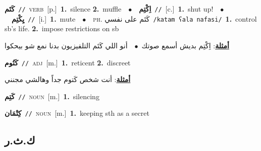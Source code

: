 \documentclass[10pt,a4paper,twoside]{article} %
\begin{document}
\begin{multicols}{2}
{\setlength\topsep{0pt}\textbf{\foreignlanguage{arabic}{كَتَم}}\ {\color{gray}\texttt{//}\color{black}}\ \textsc{verb}\ [p.]\ \textbf{1.}~silence  \textbf{2.}~muffle\ \ $\bullet$\ \ \setlength\topsep{0pt}\textbf{\foreignlanguage{arabic}{اِكْتِم}}\ {\color{gray}\texttt{//}\color{black}}\ [c.]\ \textbf{1.}~shut up!\ \ $\bullet$\ \ \setlength\topsep{0pt}\textbf{\foreignlanguage{arabic}{يِكْتِم}}\ {\color{gray}\texttt{//}\color{black}}\ [i.]\ \textbf{1.}~mute\ \ $\bullet$\ \ \textsc{ph.} \color{gray} \foreignlanguage{arabic}{كَتَم على نفسي}\color{black}\ {\color{gray}\texttt{/{\sffamily katam ʕala nafasi}/}\color{black}}\ \textbf{1.}~control sb's life.  \textbf{2.}~impose restrictions on sb\  \begin{flushright}\color{gray}\foreignlanguage{arabic}{\textbf{\underline{\foreignlanguage{arabic}{أمثلة}}}: اِكْتِم بديش أسمع صوتك\ $\bullet$\ \  أنو اللي كَتَم التلفيزيون بدنا نمع شو بيحكوا}\end{flushright}\color{black}} \vspace{2mm}

{\setlength\topsep{0pt}\textbf{\foreignlanguage{arabic}{كَتُوم}}\ {\color{gray}\texttt{//}\color{black}}\ \textsc{adj}\ [m.]\ \textbf{1.}~reticent  \textbf{2.}~discreet\  \begin{flushright}\color{gray}\foreignlanguage{arabic}{\textbf{\underline{\foreignlanguage{arabic}{أمثلة}}}: أنت شخص كَتوم جداً وهالشي مجنني}\end{flushright}\color{black}} \vspace{2mm}

{\setlength\topsep{0pt}\textbf{\foreignlanguage{arabic}{كَتِم}}\ {\color{gray}\texttt{//}\color{black}}\ \textsc{noun}\ [m.]\ \textbf{1.}~silencing\ } \vspace{2mm}

{\setlength\topsep{0pt}\textbf{\foreignlanguage{arabic}{كِتْمَان}}\ {\color{gray}\texttt{//}\color{black}}\ \textsc{noun}\ [m.]\ \textbf{1.}~keeping sth as a secret\ } \vspace{2mm}

\vspace{-3mm}
\subsection*{\color{blue}\foreignlanguage{arabic}{ك.ث.ر}\color{blue}{}} 


\end{multicols}
\end{document}
